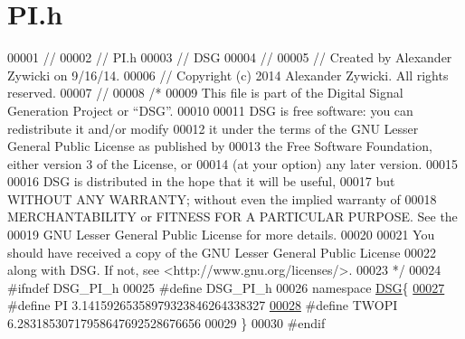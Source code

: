 \hypertarget{_p_i_8h_source}{\section{P\+I.\+h}
\label{_p_i_8h_source}
}

\begin{DoxyCode}
00001 \textcolor{comment}{//}
00002 \textcolor{comment}{//  PI.h}
00003 \textcolor{comment}{//  DSG}
00004 \textcolor{comment}{//}
00005 \textcolor{comment}{//  Created by Alexander Zywicki on 9/16/14.}
00006 \textcolor{comment}{//  Copyright (c) 2014 Alexander Zywicki. All rights reserved.}
00007 \textcolor{comment}{//}
00008 \textcolor{comment}{/*}
00009 \textcolor{comment}{ This file is part of the Digital Signal Generation Project or “DSG”.}
00010 \textcolor{comment}{}
00011 \textcolor{comment}{ DSG is free software: you can redistribute it and/or modify}
00012 \textcolor{comment}{ it under the terms of the GNU Lesser General Public License as published by}
00013 \textcolor{comment}{ the Free Software Foundation, either version 3 of the License, or}
00014 \textcolor{comment}{ (at your option) any later version.}
00015 \textcolor{comment}{}
00016 \textcolor{comment}{ DSG is distributed in the hope that it will be useful,}
00017 \textcolor{comment}{ but WITHOUT ANY WARRANTY; without even the implied warranty of}
00018 \textcolor{comment}{ MERCHANTABILITY or FITNESS FOR A PARTICULAR PURPOSE.  See the}
00019 \textcolor{comment}{ GNU Lesser General Public License for more details.}
00020 \textcolor{comment}{}
00021 \textcolor{comment}{ You should have received a copy of the GNU Lesser General Public License}
00022 \textcolor{comment}{ along with DSG.  If not, see <http://www.gnu.org/licenses/>.}
00023 \textcolor{comment}{ */}
00024 \textcolor{preprocessor}{#ifndef DSG\_PI\_h}
00025 \textcolor{preprocessor}{#define DSG\_PI\_h}
00026 \textcolor{keyword}{namespace }\hyperlink{namespace_d_s_g}{DSG}\{
\hypertarget{_p_i_8h_source_l00027}{}\hyperlink{_p_i_8h_a598a3330b3c21701223ee0ca14316eca}{00027} \textcolor{preprocessor}{#define PI    3.14159265358979323846264338327}
\hypertarget{_p_i_8h_source_l00028}{}\hyperlink{_p_i_8h_a4912c64aec0c943b7985db6cb61ff83a}{00028} \textcolor{preprocessor}{#define TWOPI 6.28318530717958647692528676656}
00029 \}
00030 \textcolor{preprocessor}{#endif}
\end{DoxyCode}
